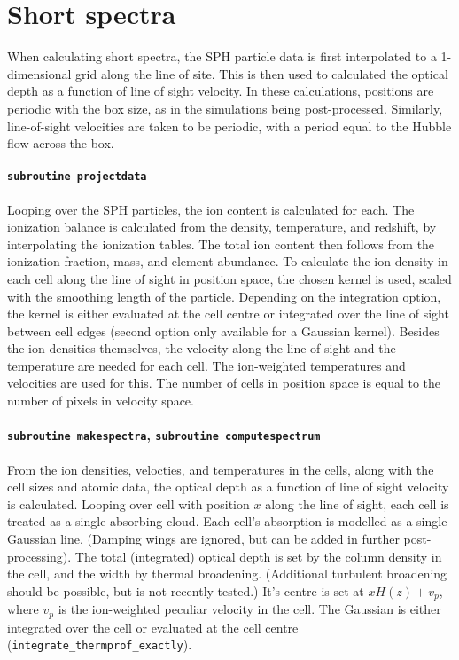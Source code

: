 \documentclass{report}
\begin{document}
\section{Short spectra}
When calculating short spectra, the SPH particle data is first interpolated to a 1-dimensional grid along the line of site. This is then used to calculated the optical depth as a function of line of sight velocity. In these calculations, positions are periodic with the box size, as in the simulations being post-processed. Similarly, line-of-sight velocities are taken to be periodic, with a period equal to the Hubble flow across the box.

\paragraph{{\tt subroutine projectdata}}
Looping over the SPH particles, the ion content is calculated for each. The ionization balance is calculated from the density, temperature, and redshift, by interpolating the ionization tables. The total ion content then follows from the ionization fraction, mass, and element abundance. To calculate the ion density in each cell along the line of sight in position space, the chosen kernel is used, scaled with the smoothing length of the particle. Depending on the integration option, the kernel is either evaluated at the cell centre or integrated over the line of sight between cell edges (second option only available for a Gaussian kernel). Besides the ion densities themselves, the velocity along the line of sight and the temperature are needed for each cell. The ion-weighted temperatures and velocities are used for this. The number of cells in position space is equal to the number of pixels in velocity space.

\paragraph{{\tt subroutine makespectra}, {\tt subroutine computespectrum}}
From the ion densities, velocties, and temperatures in the cells, along with the cell sizes and atomic data, the optical depth as a function of line of sight velocity is calculated. 
Looping over cell with position $x$ along the line of sight, each cell is treated as a single absorbing cloud. 
Each cell's absorption is modelled as a single Gaussian line. (Damping wings are ignored, but can be added in further post-processing). The total (integrated) optical depth is set by the column density in the cell, and the width by thermal broadening. (Additional turbulent broadening should be possible, but is not recently tested.) It's centre is set at $x H(z) + v_p$, where $v_p$ is the ion-weighted peculiar velocity in the cell. The Gaussian is either integrated over the cell or evaluated at the cell centre ({\tt integrate\_thermprof\_exactly}).
 

 
\end{document}
